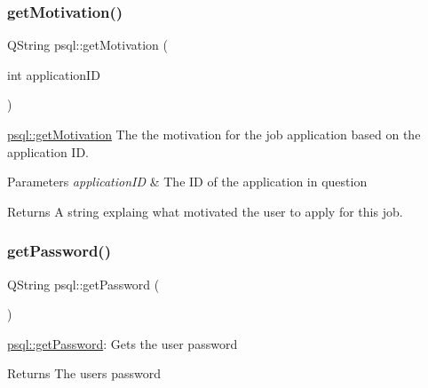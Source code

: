 \subsubsection{\texorpdfstring{get\+Motivation()}{getMotivation()}}
{\footnotesize\ttfamily Q\+String psql\+::get\+Motivation (\begin{DoxyParamCaption}\item[{int}]{application\+ID }\end{DoxyParamCaption})}



\hyperlink{classpsql_aca1b2273937491e113089c1547caf49b}{psql\+::get\+Motivation} The the motivation for the job application based on the application ID. 


\begin{DoxyParams}{Parameters}
{\em application\+ID} & The ID of the application in question \\
\hline
\end{DoxyParams}
\begin{DoxyReturn}{Returns}
A string explaing what motivated the user to apply for this job. 
\end{DoxyReturn}
\mbox{\label{classpsql_a817e5a88f877cac6f843c1e743aec096}} 
\subsubsection{\texorpdfstring{get\+Password()}{getPassword()}}
{\footnotesize\ttfamily Q\+String psql\+::get\+Password (\begin{DoxyParamCaption}{ }\end{DoxyParamCaption})}



\hyperlink{classpsql_a817e5a88f877cac6f843c1e743aec096}{psql\+::get\+Password}\+: Gets the user password 

\begin{DoxyReturn}{Returns}
The user\textquotesingle{}s password 
\end{DoxyReturn}
\mbox{\label{classpsql_ab6edb8a2e42d8ac7c4ae29f5b0cb494f}} 
